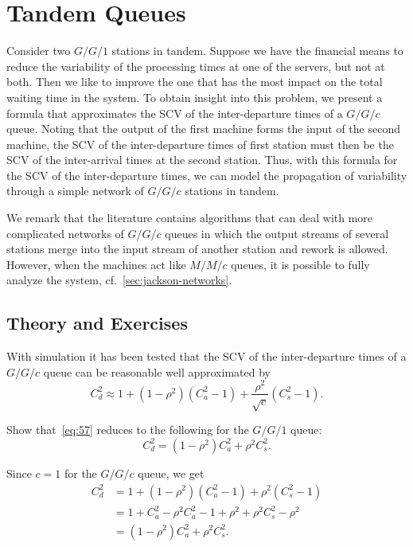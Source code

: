 \section{Tandem Queues}
\label{sec:tandem-queues}


Consider two $G/G/1$ stations in tandem.
Suppose we have the financial means to reduce the variability of the processing times at one of the servers, but not at both.
Then we like to improve the one that has the most impact on the total waiting time in the system.
To obtain insight into this problem, we present a formula that approximates the SCV of the inter-departure times of a $G/G/c$ queue.
Noting that the output of the first machine forms the input of the second machine, the SCV of the inter-departure times of first station must then be the SCV of the inter-arrival times at the second station.
Thus, with this formula for the SCV of the inter-departure times, we can model the propagation of variability through a simple network of $G/G/c$ stations in tandem.

We remark that the literature contains algorithms that can deal with more complicated networks of $G/G/c$ queues in which the output streams of several stations merge into the input stream of another station and rework is allowed.
However, when the machines act like $M/M/c$ queues, it is possible to fully analyze the system, cf.~\cref{sec:jackson-networks}.

\subsection*{Theory and Exercises}


With simulation it has been tested that the SCV of the inter-departure times of a $G/G/c$ queue can be reasonable well approximated by
\begin{equation}\label{eq:57}
 C_{d}^2 \approx 1 + (1-\rho^2)(C_{a}^2-1) + \frac{\rho^2}{\sqrt{c}}(C_{s}^2-1).
\end{equation}


\begin{exercise}
 Show that~\cref{eq:57}  reduces to the following for the $G/G/1$ queue: 
\begin{equation}
 \label{eq:40}
 C_{d}^2 =  (1-\rho^2) C_{a}^2 + \rho^2 C_{s}^2.
\end{equation}
\begin{solution}
 Since $c=1$ for the $G/G/c$ queue, we get
\begin{align*}
 C_{d}^2 
&= 1 + (1-\rho^2)(C_{a}^2-1) + \rho^2(C_{s}^2-1) \\
&= 1 + C_a^2 - \rho^2 C_{a}^2 -1 + \rho^2 + \rho^2 C_{s}^2 -\rho^2 \\
&= (1-\rho^2) C_a^2 + \rho^2 C_{s}^2.
\end{align*}
\end{solution}
\end{exercise}

